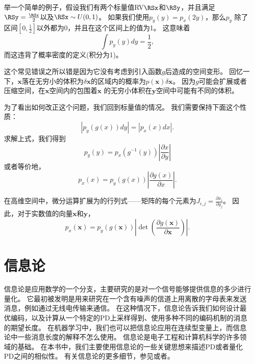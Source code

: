 举一个简单的例子，假设我们有两个标量值\gls{RV}$\RSx$和$\RSy$，并且满足$\RSy= \frac{\RSx}{2}$以及$\RSx \sim U(0, 1)$。
如果我们使用$p_y(y) = p_x(2y)$，那么$p_y$ 除了区间$[0, \frac{1}{2}]$以外都为0，并且在这个区间上的值为1。
这意味着
\begin{equation}
\int p_y(y)dy = \frac{1}{2},
\end{equation}
而这违背了概率密度的定义(积分为1)。

这个常见错误之所以错是因为它没有考虑到引入函数$g$后造成的空间变形。
回忆一下，$\bm{x}$落在无穷小的体积为$\delta \bm{x}$的区域内的概率为$p(\bm{x})\delta\bm{x}$。
因为$g$可能会扩展或者压缩空间，在$\bm{x}$空间内的包围着$\bm{x}$ 的无穷小体积在$\bm{y}$空间中可能有不同的体积。


为了看出如何改正这个问题，我们回到标量值的情况。
我们需要保持下面这个性质：
\begin{equation}
|p_y(g(x))dy| = |p_x(x)dx|.
\end{equation}
求解上式，我们得到
\begin{equation}
p_y(y) = p_x(g^{-1}(y)) \left \vert \frac{\partial x}{\partial y} \right \vert
\end{equation}
或者等价地，
\begin{equation}
p_x(x) = p_y(g(x)) \left | \frac{\partial g(x)}{\partial x} \right |.
\end{equation}

在高维空间中，微分运算扩展为的行列式——矩阵的每个元素为$J_{i, j} = \frac{\partial x_i}{\partial y_j}$。
因此，对于实数值的向量$\bm{x}$和$\bm{y}$，
\begin{equation}
\label{eqn:3.47}
p_x(\bm{x}) = p_y(g(\bm{x})) \left | \det \left ( \frac{\partial g(\bm{x})}{\partial \bm{x}} \right) \right |.
\end{equation}

\section{信息论}
\label{sec:information_theory}

信息论是应用数学的一个分支，主要研究的是对一个信号能够提供信息的多少进行量化。
它最初被发明是用来研究在一个含有噪声的信道上用离散的字母表来发送消息，例如通过无线电传输来通信。
在这种情况下，信息论告诉我们如何设计最优编码，以及计算从一个特定的\gls{PD}上采样得到、使用多种不同的编码机制的消息的期望长度。
在机器学习中，我们也可以把信息论应用在连续型变量上，而信息论中一些消息长度的解释不怎么使用。
信息论是电子工程和计算机科学的许多领域的基础。
在本书中，我们主要使用信息论的一些关键思想来描述\gls{PD}或者量化\gls{PD}之间的相似性。
有关信息论的更多细节，参见\cite{cover-book2006}或者\cite{MacKay03}。

